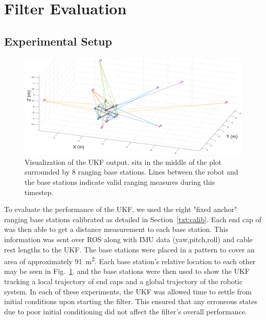 {\section{Filter Evaluation}
\subsection{Experimental Setup}

\begin{figure}[tpbh]
 \centering
  \includegraphics[width=\linewidth]{tex/img/matlab_figure_ranging_b45.pdf}
 \caption{Visualization of the UKF output. \SB{} sits in the middle of the plot surrounded by 8 ranging base stations. Lines between the robot and the base stations indicate valid ranging measures during this timestep.}
\label{fig:SUPERballMATLAB}
 \end{figure}
 
To evaluate the performance of the UKF, we used the eight "fixed anchor" ranging base stations calibrated as detailed in Section~\ref{txt:calib}.
Each end cap of \SB{} was then able to get a distance measurement to each base station.
This information was sent over ROS along with IMU data (yaw,pitch,roll) and cable rest lengths to the UKF.
The base stations were placed in a pattern to cover an area of approximately \SI{91}{\meter^2}. 
Each base station's relative location to each other may be seen in Fig.~\ref{fig:SUPERballMATLAB}.
\SB{} and the base stations were then used to show the UKF tracking a local trajectory of end caps and a global trajectory of the robotic system.
In each of these experiments, the UKF was allowed time to settle from initial conditions upon starting the filter.
This ensured that any erroneous states due to poor initial conditioning did not affect the filter's overall performance. 

}
